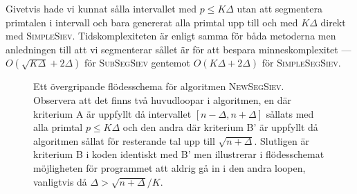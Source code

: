 Givetvis hade vi kunnat sålla intervallet med \(p \leq K \Delta\) utan att segmentera primtalen i intervall och bara genererat alla primtal upp till och med \(K \Delta\) direkt med \textsc{SimpleSiev}. Tidskomplexiteten är enligt \cite{HaraldSieve} samma för båda metoderna men anledningen till att vi segmenterar sållet är för att bespara minneskomplexitet --- \(O(\sqrt{K \Delta} + 2\Delta)\) för \textsc{SubSegSiev} gentemot \(O(K \Delta + 2\Delta)\) för \textsc{SimpleSegSiev}. 


\begin{figure}
    \centering
    
    \caption{Ett övergripande flödesschema för algoritmen \textsc{NewSegSiev}. Observera att det finns två huvudloopar i algoritmen, en där kriterium A är uppfyllt då intervallet \([n - \Delta, n + \Delta]\) sållats med alla primtal \(p \leq K \Delta\) och den andra där kriterium B' är uppfyllt då algoritmen sållat för resterande tal upp till \(\sqrt{n + \Delta}\). Slutligen är kriterium B i koden identiskt med B' men illustrerar i flödesschemat möjligheten för programmet att aldrig gå in i den andra loopen, vanligtvis då \(\Delta > \sqrt{n + \Delta}/K\).}
    \label{fig:flowchart}
\end{figure}



